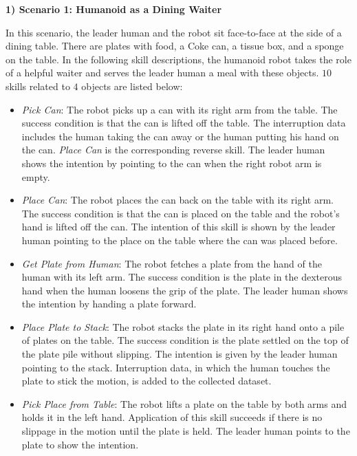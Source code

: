 \noindent\textbf{1) Scenario 1: Humanoid as a Dining Waiter}

In this scenario, the leader human and the robot sit face-to-face at the side of a dining table. 
There are plates with food, a Coke can, a tissue box, and a sponge on the table.
In the following skill descriptions, the humanoid robot takes the role of a helpful waiter and serves the leader human a meal with these objects.
$10$ skills related to $4$ objects are listed below:

\begin{itemize}[leftmargin=*]
    \item \textit{Pick Can}: The robot picks up a can with its right arm from the table. 
    The success condition is that the can is lifted off the table.
    The interruption data includes the human taking the can away or the human putting his hand on the can. 
    \textit{Place Can} is the corresponding reverse skill.
    The leader human shows the intention by pointing to the can when the right robot arm is empty.
    
    \item \textit{Place Can}: The robot places the can back on the table with its right arm. 
    The success condition is that the can is placed on the table and the robot's hand is lifted off the can.
    The intention of this skill is shown by the leader human pointing to the place on the table where the can was placed before.
    
    \item \textit{Get Plate from Human}: The robot fetches a plate from the hand of the human with its left arm.
    The success condition is the plate in the dexterous hand when the human loosens the grip of the plate.
    The leader human shows the intention by handing a plate forward.
    
    \item \textit{Place Plate to Stack}: The robot stacks the plate in its right hand onto a pile of plates on the table.
    The success condition is the plate settled on the top of the plate pile without slipping.
    The intention is given by the leader human pointing to the stack.
    Interruption data, in which the human touches the plate to stick the motion, is added to the collected dataset.
    
    \item \textit{Pick Place from Table}: The robot lifts a plate on the table by both arms and holds it in the left hand.
    Application of this skill succeeds if there is no slippage in the motion until the plate is held.
    The leader human points to the plate to show the intention.
    

\end{itemize}
